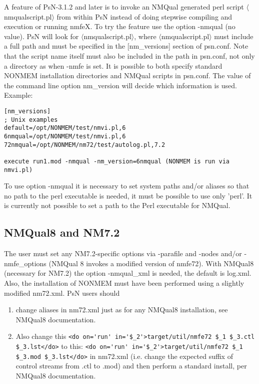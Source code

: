 A feature of PsN-3.1.2 and later is to invoke an NMQual generated perl script $\langle$nmqualscript.pl$\rangle$ from within PsN instead of doing stepwise compiling and execution or running nmfeX. To try the feature use the option -nmqual (no value). PsN will look for $\langle$nmqualscript.pl$\rangle$, where $\langle$nmqualscript.pl$\rangle$ must include a full path and must be specified in the [nm\_versions] section of psn.conf. Note that the script name itself must also be included in the path in psn.conf, not only a directory as when -nmfe is set. It is possible to both specify standard NONMEM installation directories and NMQual scripts in psn.conf. The value of the command line option nm\_version will decide which information is used. Example:
\begin{verbatim}
[nm_versions]
; Unix examples
default=/opt/NONMEM/test/nmvi.pl,6
6nmqual=/opt/NONMEM/test/nmvi.pl,6
72nmqual=/opt/NONMEM/nm72/test/autolog.pl,7.2

execute run1.mod -nmqual -nm_version=6nmqual (NONMEM is run via nmvi.pl)
\end{verbatim}
To use option -nmqual it is necessary to set system paths and/or aliases so that no path to the perl executable is needed, it must be possible to use only 'perl'. It is currently not possible to set a path to the Perl executable for NMQual.

\subsection{NMQual8 and NM7.2}
The user must set any NM7.2-specific options via -parafile and -nodes and/or -nmfe\_options (NMQual 8 invokes a modified version of nmfe72). With NMQual8 (necessary for NM7.2) the option -nmqual\_xml is needed, the default is log.xml.  Also, the installation of NONMEM must have been performed using a slightly modified nm72.xml. PsN users should

\begin{enumerate}
	\item change aliases in nm72.xml just as for any NMQual8 installation, see NMQual8 documentation.
	\item Also change this
\verb|<do on='run' in='$_2'>target/util/nmfe72 $_1 $_3.ctl $_3.lst</do>|
to this:
\verb|<do on='run' in='$_2'>target/util/nmfe72 $_1 $_3.mod $_3.lst</do>|
in nm72.xml (i.e. change the expected suffix of control streams from .ctl to .mod) and then perform a standard install, per NMQual8 documentation.
\end{enumerate}

